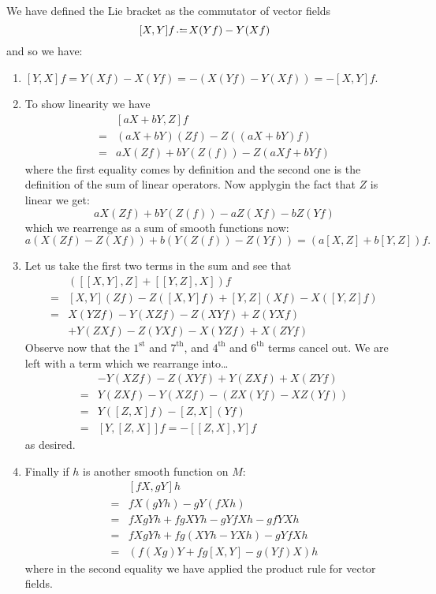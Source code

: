 \documentclass[12pt]{memoir}
\begin{document}
   \begin{ptcbr}
	We have defined the Lie bracket as the commutator of vector fields
	$$[X,Y]f\defeq X(Yf)-Y(Xf)$$
	and so we have:
	\begin{enumerate}
		\item $[Y,X]f=Y(Xf)-X(Yf)=-(X(Yf)-Y(Xf))=-[X,Y]f$.
		\item To show linearity we have
		\begin{align*}
			&[aX+bY,Z]f\\
			=&(aX+bY)(Zf)-Z((aX+bY)f)\\
			=&aX(Zf)+bY(Z(f))-Z(aXf+bYf)
		\end{align*}
		where the first equality comes by definition and the second one is the definition of the sum of linear operators. Now applygin the fact that $Z$ is linear we get: 
		$$aX(Zf)+bY(Z(f))-aZ(Xf)-bZ(Yf)$$
		which we rearrenge as a sum of smooth functions now:
		$$a(X(Zf)-Z(Xf))+b(Y(Z(f))-Z(Yf))=(a[X,Z]+b[Y,Z])f.$$
		\item Let us take the first two terms in the sum and see that 
		\begin{align*}
			&([[X,Y],Z] + [[Y,Z],X])f\\
			=&[X,Y](Zf)-Z([X,Y]f)+[Y,Z](Xf)-X([Y,Z]f)\\
			=&X(YZf)-Y(XZf)-Z(XYf)+Z(YXf)\\
			&+Y(ZXf)-Z(YXf)-X(YZf)+X(ZYf)
		\end{align*}
		Observe now that the $1^{\text{st}}$ and $7^{\text{th}}$, and $4^{\text{th}}$ and $6^{\text{th}}$ terms cancel out. We are left with a term which we rearrange into\dots
		\begin{align*}
		&-Y(XZf)-Z(XYf)+Y(ZXf)+X(ZYf)\\
		=&Y(ZXf)-Y(XZf)-(ZX(Yf)-XZ(Yf))\\
		=&Y([Z,X]f)-[Z,X](Yf)\\
		=&[Y,[Z,X]]f=-[[Z,X],Y]f
		\end{align*}
		as desired.
		\item Finally if $h$ is another smooth function on $M$:
		\begin{align*}
			&[fX,gY]h\\
			=&fX(gYh)-gY(fXh)\\
			=&fXgYh+fgXYh-gYfXh-gfYXh\\
			=&fXgYh+fg(XYh-YXh)-gYfXh\\
			=&(f(Xg)Y+fg[X,Y]-g(Yf)X)h
		\end{align*}
		where in the second equality we have applied the product rule for vector fields. 
	\end{enumerate}
   \end{ptcbr}
\end{document}
